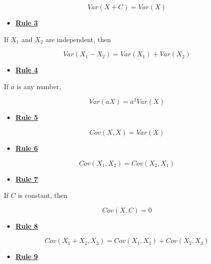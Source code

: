 \documentclass[
]{book}
\providecommand{\tightlist}{%
  \setlength{\itemsep}{0pt}\setlength{\parskip}{0pt}}
\begin{document}
\[
Var\left(X + C\right) = Var\left(X\right)
\]

\begin{itemize}
\tightlist
\item
  \href{./variance.html\#Rule3}{\textbf{Rule 3}}
\end{itemize}

If \(X_{1}\) and \(X_{2}\) are independent, then

\[
Var\left(X_{1} - X_{2}\right) =
Var\left(X_{1}\right) + Var\left(X_{2}\right)
\]

\begin{itemize}
\tightlist
\item
  \href{./variance.html\#Rule4}{\textbf{Rule 4}}
\end{itemize}

If \(a\) is any number,

\[
Var\left(aX\right) = a^2 Var\left(X\right)
\]

\begin{itemize}
\tightlist
\item
  \href{./covariance.html\#Rule5}{\textbf{Rule 5}}
\end{itemize}

\[
Cov(X, X) = Var(X)
\]

\begin{itemize}
\tightlist
\item
  \href{./covariance.html\#Rule6}{\textbf{Rule 6}}
\end{itemize}

\[
Cov\left(X_{1}, X_{2}\right) = Cov\left(X_{2}, X_{1}\right)
\]

\begin{itemize}
\tightlist
\item
  \href{./covariance.html\#Rule7}{\textbf{Rule 7}}
\end{itemize}

If \(C\) is constant, then

\[
Cov\left(X, C\right) = 0
\]

\begin{itemize}
\tightlist
\item
  \href{./covariance.html\#Rule8}{\textbf{Rule 8}}
\end{itemize}

\[
Cov\left(X_{1} + X_{2}, X_{3}\right) = Cov\left(X_{1}, X_{3}\right) + Cov\left(X_{2}, X_{3}\right)  
\]

\begin{itemize}
\tightlist
\item
  \href{./covariance.html\#Rule9}{\textbf{Rule 9}}
\end{itemize}
\end{document}
